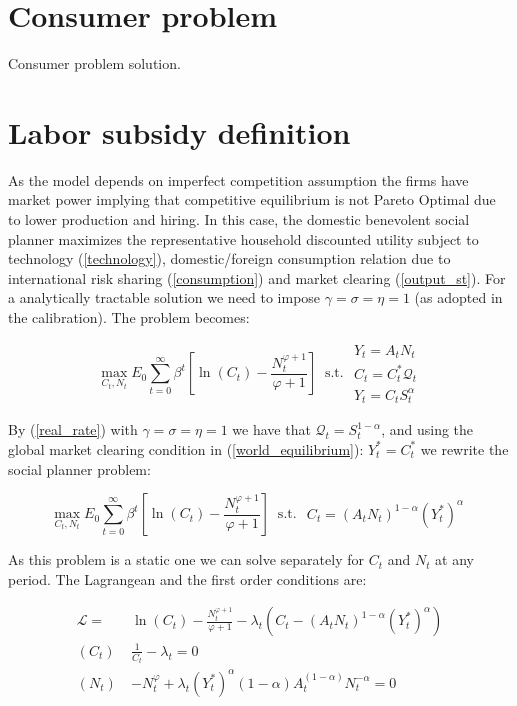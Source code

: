 \documentclass{article}
\begin{document}
\appendix
\section{Consumer problem}
Consumer problem solution.

\section{Labor subsidy definition}
As the model depends on imperfect competition assumption the firms have market power implying that competitive equilibrium is not Pareto Optimal due to lower production and hiring. In this case, the domestic benevolent social planner maximizes the representative household discounted utility subject to technology (\ref{technology}), domestic/foreign consumption relation due to international risk sharing (\ref{consumption}) and market clearing (\ref{output_st}). For a analytically tractable solution we need to impose $\gamma = \sigma = \eta = 1$ (as adopted in the calibration). The problem becomes:

$$\max_{C_t, N_t} E_0 \sum^\infty_{t=0} \beta^t \left[\ln(C_t) - \frac{N_t^{\varphi+1}}{\varphi+1} \right] \ \textrm{ s.t. } \begin{matrix}
    Y_t = A_t N_t\\
    C_t = C_t^* \mathcal Q_{t}\\
    Y_t = C_t S_t^\alpha
\end{matrix}$$

By (\ref{real_rate}) with $\gamma = \sigma = \eta = 1$ we have that $\mathcal{Q}_t = S_t^{1-\alpha}$, and using the global market clearing condition in (\ref{world_equilibrium}): $Y_t^* = C_t^*$ we rewrite the social planner problem:

$$\max_{C_t, N_t} E_0 \sum^\infty_{t=0} \beta^t \left[\ln(C_t) - \frac{N_t^{\varphi+1}}{\varphi+1} \right] \ \textrm{ s.t. } \begin{matrix}
    C_t = (A_t N_t)^{1-\alpha}(Y_t^*)^\alpha
\end{matrix}$$

As this problem is a static one we can solve separately for $C_t$ and $N_t$ at any period. The Lagrangean and the first order conditions are:

\begin{equation*}
    \begin{split}
        \mathcal L = & \ln(C_t) - \frac{N_t^{\varphi+1}}{\varphi+1} - \lambda_t(C_t - (A_t N_t)^{1-\alpha}(Y_t^*)^\alpha) \\
        (C_t) \ & \frac{1}{C_t} - \lambda_t = 0\\
        (N_t) \ & -N_t^\varphi + \lambda_t (Y_t^*)^\alpha (1 - \alpha) A_t^{(1 - \alpha)}N_t^{-\alpha} = 0\\
    \end{split}
\end{equation*}
\end{document}
